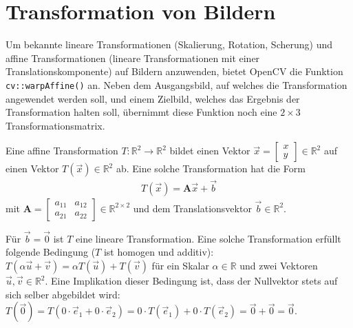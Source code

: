 \documentclass{whswinvcbook}
\begin{document}
\section{Transformation von Bildern}
Um bekannte lineare Transformationen (Skalierung, Rotation, Scherung) und affine Transformationen (lineare Transformationen mit einer Translationskomponente) auf Bildern anzuwenden, bietet OpenCV die Funktion \texttt{cv::warpAffine()} an. Neben dem Ausgangsbild, auf welches die Transformation angewendet werden soll, und einem Zielbild, welches das Ergebnis der Transformation halten soll, übernimmt diese Funktion noch eine $2\times3$ Transformationsmatrix.

Eine affine Transformation $T:\mathbb{R}^2\rightarrow\mathbb{R}^2$ bildet einen Vektor $\vec{x}=\begin{bmatrix}x\\y\end{bmatrix}\in\mathbb{R}^2$ auf einen Vektor $T(\vec{x})\in\mathbb{R}^2$ ab. Eine solche Transformation hat die Form
\begin{gather*}
    T(\vec{x})=\mathbf{A}\vec{x}+\vec{b}
\end{gather*}
mit $\mathbf{A}=\begin{bmatrix}a_{11}&a_{12}\\a_{21}&a_{22}\end{bmatrix}\in\mathbb{R}^{2\times2}$ und dem Translationsvektor $\vec{b}\in\mathbb{R}^2$.

Für $\vec{b}=\vec{0}$ ist $T$ eine lineare Transformation. Eine solche Transformation erfüllt folgende Bedingung ($T$ ist homogen und additiv): $T(\alpha\vec{u}+\vec{v})=\alpha T(\vec{u})+T(\vec{v})$ für ein Skalar $\alpha\in\mathbb{R}$ und zwei Vektoren $\vec{u},\vec{v}\in\mathbb{R}^2$. Eine Implikation dieser Bedingung ist, dass der Nullvektor stets auf sich selber abgebildet wird: $T(\vec{0})=T(0\cdot\vec{e}_1+0\cdot\vec{e}_2)=0\cdot T(\vec{e}_1)+0\cdot T(\vec{e}_2)=\vec{0}+\vec{0}=\vec{0}$.
\end{document}
